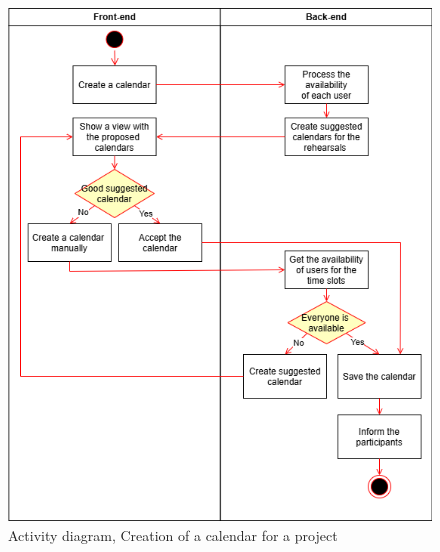 \documentclass[11pt]{article}
\begin{document}
\begin{figure}[htbp!]
    \centering
    \includegraphics[scale=0.5]{calendarselection.drawio.png}
    \caption{Activity diagram, Creation of a calendar for a project}
\end{figure}
\end{document}
